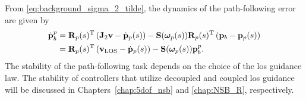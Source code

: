 From \eqref{eq:background_sigma_2_tilde}, the dynamics of the path-following error are given by
\begin{equation}
    \begin{split}
        \dot{\mathbf{p}}_b^p &= \mathbf{R}_p(s)^{\mathrm{T}} \left(\mathbf{J}_2 \mathbf{v} - \dot{\mathbf{p}}_p(s)\right) - \mathbf{S}(\bm{\omega}_p(s))\mathbf{R}_p(s)^{\mathrm{T}}\left(\mathbf{p}_b - \mathbf{p}_p(s)\right) \\
        &= \mathbf{R}_p(s)^{\mathrm{T}} \left(\mathbf{v}_{\rm LOS} - \dot{\mathbf{p}}_p(s)\right) - \mathbf{S}(\bm{\omega}_p(s))\mathbf{p}_b^p.
    \end{split}
\end{equation}
The stability of the path-following task depends on the choice of the \gls{los} guidance law.
The stability of controllers that utilize decoupled and coupled \gls{los} guidance will be discussed in Chapters~\ref{chap:5dof_nsb} and \ref{chap:NSB_R}, respectively.
